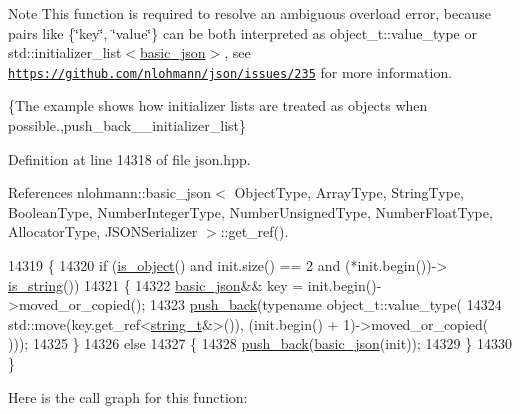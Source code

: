 \begin{DoxyNote}{Note}
This function is required to resolve an ambiguous overload error, because pairs like {\ttfamily \{\char`\"{}key\char`\"{}, \char`\"{}value\char`\"{}\}} can be both interpreted as {\ttfamily object\+\_\+t\+::value\+\_\+type} or {\ttfamily std\+::initializer\+\_\+list$<$\hyperlink{classnlohmann_1_1basic__json}{basic\+\_\+json}$>$}, see \href{https://github.com/nlohmann/json/issues/235}{\tt https\+://github.\+com/nlohmann/json/issues/235} for more information.
\end{DoxyNote}
\{The example shows how initializer lists are treated as objects when possible.,push\+\_\+back\+\_\+\+\_\+initializer\+\_\+list\} 

Definition at line 14318 of file json.\+hpp.



References nlohmann\+::basic\+\_\+json$<$ Object\+Type, Array\+Type, String\+Type, Boolean\+Type, Number\+Integer\+Type, Number\+Unsigned\+Type, Number\+Float\+Type, Allocator\+Type, J\+S\+O\+N\+Serializer $>$\+::get\+\_\+ref().


\begin{DoxyCode}
14319     \{
14320         \textcolor{keywordflow}{if} (\hyperlink{classnlohmann_1_1basic__json_af8f511af124e82e4579f444b4175787c}{is\_object}() and init.size() == 2 and (*init.begin())->
      \hyperlink{classnlohmann_1_1basic__json_a69b596a4a6683b362095c9a139637396}{is\_string}())
14321         \{
14322             \hyperlink{classnlohmann_1_1basic__json_aed115142bd0c6c66c864700e0467df55}{basic\_json}&& key = init.begin()->moved\_or\_copied();
14323             \hyperlink{classnlohmann_1_1basic__json_ac8e523ddc8c2dd7e5d2daf0d49a9c0d7}{push\_back}(\textcolor{keyword}{typename} object\_t::value\_type(
14324                           std::move(key.get\_ref<\hyperlink{classnlohmann_1_1basic__json_a61f8566a1a85a424c7266fb531dca005}{string\_t}&>()), (init.begin() + 1)->moved\_or\_copied(
      )));
14325         \}
14326         \textcolor{keywordflow}{else}
14327         \{
14328             \hyperlink{classnlohmann_1_1basic__json_ac8e523ddc8c2dd7e5d2daf0d49a9c0d7}{push\_back}(\hyperlink{classnlohmann_1_1basic__json_aed115142bd0c6c66c864700e0467df55}{basic\_json}(init));
14329         \}
14330     \}
\end{DoxyCode}
Here is the call graph for this function\+:
\mbox{\label{classnlohmann_1_1basic__json_a1ef93e2006dbe52667294f5ef38b0b10}} 
